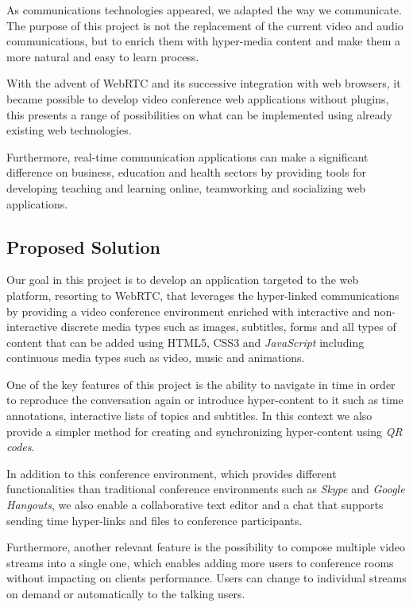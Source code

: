 \documentclass[conference,compsoc,a4paper]{IEEEtran}
\begin{document}
	As communications technologies appeared, we adapted the way we communicate. The purpose of this project is not the replacement of the current video and audio communications, but to enrich them with hyper-media content and make them a more natural and easy to learn process. 

	With the advent of WebRTC and its successive integration with web browsers, it became possible to develop video conference web applications without plugins, this presents a range of possibilities on what can be implemented using already existing web technologies.
		
    Furthermore, real-time communication applications can make a significant difference on business, education and health sectors by providing tools for developing teaching and learning online, teamworking and socializing web applications.

\subsection{Proposed Solution}
\label{section:proposed}

	Our goal in this project is to develop an application targeted to the web platform, resorting to \gls{WebRTC}, that leverages the hyper-linked communications by providing a video conference environment enriched with interactive and non-interactive discrete media types such as images, subtitles, forms and all types of content that can be added using \gls{HTML}5, \gls{CSS}3 and \emph{JavaScript} including continuous media types such as video, music and animations.

	One of the key features of this project is the ability to navigate in time in order to reproduce the conversation again or introduce hyper-content to it such as time annotations, interactive lists of topics and subtitles. In this context we also provide a simpler method for creating and synchronizing hyper-content using \emph{QR codes}.

	In addition to this conference environment, which provides different functionalities than traditional conference environments such as \emph{Skype} and \emph{Google Hangouts}, we also enable a collaborative text editor and a chat that supports sending time hyper-links and files to conference participants.

	Furthermore, another relevant feature is the possibility to compose multiple video streams into a single one, which enables adding more users to conference rooms without impacting on clients performance. Users can change to individual streams on demand or automatically to the talking users.
        
\end{document}

